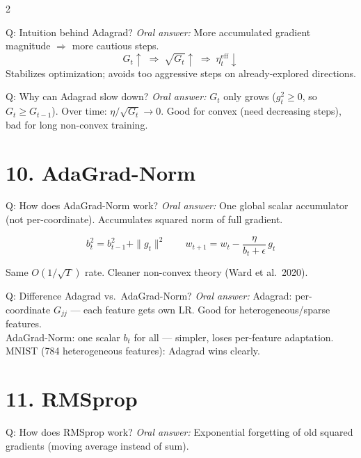 \documentclass[a4paper,9pt]{article}
\newcommand{\oral}{\textit{\color{darkgray}Oral answer: }}
\begin{document}
\begin{multicols}{2}
\begin{qa}{Q: Intuition behind Adagrad?}
\oral More accumulated gradient magnitude \(\Rightarrow\) more cautious steps.
\[
G_t \uparrow \;\Rightarrow\; \sqrt{G_t} \uparrow \;\Rightarrow\; \eta_t^{\text{eff}} \downarrow
\]
Stabilizes optimization; avoids too aggressive steps on already-explored directions.
\end{qa}

\begin{qa}{Q: Why can Adagrad slow down?}
\oral \(G_t\) only grows (\(g_t^2 \geq 0\), so \(G_t \geq G_{t-1}\)). 
Over time: \(\eta/\sqrt{G_t} \to 0\). 
Good for convex (need decreasing steps), bad for long non-convex training.
\end{qa}

\section{10. AdaGrad-Norm}

\begin{qa}{Q: How does AdaGrad-Norm work?}
\oral One global scalar accumulator (not per-coordinate).
Accumulates squared norm of full gradient.

\[
b_t^2 = b_{t-1}^2 + \|g_t\|^2
\qquad
w_{t+1} = w_t - \frac{\eta}{b_t+\epsilon}\, g_t
\]

Same \(O(1/\sqrt{T})\) rate. Cleaner non-convex theory (Ward et al.\ 2020).
\end{qa}

\begin{qa}{Q: Difference Adagrad vs.\ AdaGrad-Norm?}
\oral Adagrad: per-coordinate \(G_{jj}\) --- each feature gets own LR. Good for heterogeneous/sparse features.\\
AdaGrad-Norm: one scalar \(b_t\) for all --- simpler, loses per-feature adaptation.\\
MNIST (784 heterogeneous features): Adagrad wins clearly.
\end{qa}

\section{11. RMSprop}

\begin{qa}{Q: How does RMSprop work?}
\oral Exponential forgetting of old squared gradients (moving average instead of sum).


\end{qa}
\end{multicols}
\end{document}
